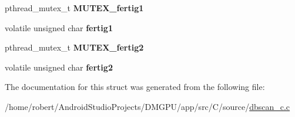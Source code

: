 \begin{DoxyCompactItemize}
pthread\+\_\+mutex\+\_\+t {\bfseries M\+U\+T\+E\+X\+\_\+fertig1}
\item 
\mbox{\label{structdbscan__pt_a8ce1ed79a8f30b769dbae5a3725d0bec}} 
volatile unsigned char {\bfseries fertig1}
\item 
\mbox{\label{structdbscan__pt_ade6e5b96f996f1d367a2595f7c237978}} 
pthread\+\_\+mutex\+\_\+t {\bfseries M\+U\+T\+E\+X\+\_\+fertig2}
\item 
\mbox{\label{structdbscan__pt_a6e02721843281f1f83499d2e7c3ffd32}} 
volatile unsigned char {\bfseries fertig2}
\end{DoxyCompactItemize}


The documentation for this struct was generated from the following file\+:\begin{DoxyCompactItemize}
\item 
/home/robert/\+Android\+Studio\+Projects/\+D\+M\+G\+P\+U/app/src/\+C/source/\mbox{\hyperlink{dbscan__c_8c}{dbscan\+\_\+c.\+c}}\end{DoxyCompactItemize}
